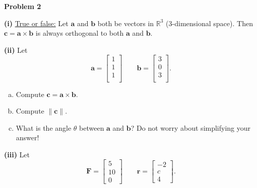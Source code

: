 \documentclass[12pt]{amsbook}
\newcommand{\R}{\mathbb{R}}
\begin{document}
    \begin{center}
    \end{center}
    








\newpage

\textbf{Problem 2}

\vspace{.25cm}

\textbf{(i)} \underline{True or false:} Let $\mathbf{a}$ and $\mathbf{b}$ both be vectors in $\R^3$ (3-dimensional space). Then $\mathbf{c}=\mathbf{a}\times \mathbf{b}$ is always orthogonal to both $\mathbf{a}$ and $\mathbf{b}$.
\vspace*{2cm}

\noindent\textbf{(ii)} Let
\[
\mathbf{a}=\begin{bmatrix} 1 \\ 1\\ 1\\ \end{bmatrix} \qquad \mathbf{b}=\begin{bmatrix} 3 \\ 0 \\ 3\\ \end{bmatrix}.
\]
\begin{enumerate}[(a)]
    \item Compute $\mathbf{c}=\mathbf{a}\times \mathbf{b}$.
    \item Compute $\|\mathbf{c}\|$.
    \item What is the angle $\theta$ between $\mathbf{a}$ and $\mathbf{b}$? Do not worry about simplifying your answer!
\end{enumerate}

\vspace*{6cm}

\textbf{(iii)} Let
\[
\mathbf{F}=\begin{bmatrix} 5 \\ 10 \\ 0 \end{bmatrix} \qquad \mathbf{r}= \begin{bmatrix} -2 \\ c\\ 4 \end{bmatrix}.
\]
\end{document}
